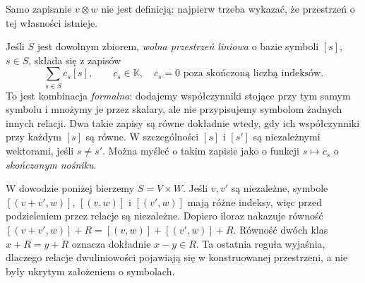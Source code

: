 Samo zapisanie $v\otimes w$ nie jest definicją: najpierw trzeba
wykazać, że przestrzeń o tej własności istnieje.

\begin{uwaga}
\label{rem:kombinacje-formalne}
Jeśli $S$ jest dowolnym zbiorem, \emph{wolna przestrzeń liniowa}
o bazie symboli $[s]$, $s\in S$, składa się z zapisów
\[
 \sum_{s\in S} c_s[s],\qquad c_s\in\mathbb K,
 \quad c_s=0\text{ poza skończoną liczbą indeksów}.
\]
To jest kombinacja \emph{formalna}: dodajemy współczynniki
stojące przy tym samym symbolu i mnożymy je przez skalary,
ale nie przypisujemy symbolom żadnych innych relacji.
Dwa takie zapisy są równe dokładnie wtedy, gdy ich
współczynniki przy każdym $[s]$ są równe. W szczególności
$[s]$ i $[s']$ są niezależnymi wektorami, jeśli $s\ne s'$.
Można myśleć o takim zapisie jako o funkcji
$s\mapsto c_s$ o \emph{skończonym nośniku}.

W dowodzie poniżej bierzemy $S=V\times W$. Jeśli
$v,v'$ są niezależne, symbole $[(v+v',w)]$, $[(v,w)]$
i $[(v',w)]$ mają różne indeksy, więc przed podzieleniem
przez relacje są niezależne. Dopiero iloraz nakazuje równość
$[(v+v',w)]+R=[(v,w)]+[(v',w)]+R$.
Równość dwóch klas $x+R=y+R$ oznacza dokładnie $x-y\in R$.
Ta ostatnia reguła wyjaśnia, dlaczego relacje dwuliniowości
pojawiają się w konstruowanej przestrzeni, a nie były
ukrytym założeniem o symbolach.
\end{uwaga}

